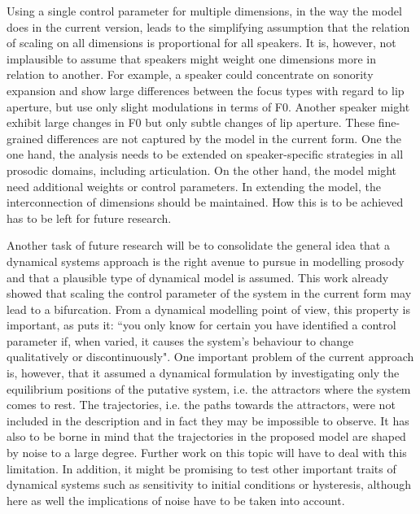 Using a single control parameter for multiple dimensions, in the way the model does in the current version, leads to the simplifying assumption that the relation of scaling on all dimensions is proportional for all speakers. It is, however, not implausible to assume that speakers might weight one dimensions more in relation to another. For example, a speaker could concentrate on sonority expansion and show large differences between the focus types with regard to lip aperture, but use only slight modulations in terms of F0. Another speaker might exhibit large changes in F0 but only subtle changes of lip aperture. These fine-grained differences are not captured by the model in the current form. One the one hand, the analysis needs to be extended on speaker-specific strategies in all prosodic domains, including articulation. On the other hand, the model might need additional weights or control parameters. In extending the model, the interconnection of dimensions should be maintained. How this is to be achieved has to be left for future research.

Another task of future research will be to consolidate the general idea that a dynamical systems approach is the right avenue to pursue in modelling prosody and that a plausible type of dynamical model is assumed. This work already showed that scaling the control parameter of the system in the current form may lead to a bifurcation. From a dynamical modelling point of view, this property is important, as \citet[1538]{Kelso2013} puts it: ``you only know for certain you have identified a control parameter if, when varied, it causes the system’s behaviour to change qualitatively or discontinuously". One important problem of the current approach is, however, that it assumed a dynamical formulation by investigating only the equilibrium positions of the putative system, i.e. the attractors where the system comes to rest. The trajectories, i.e. the paths towards the attractors, were not included in the description and in fact they may be impossible to observe. It has also to be borne in mind that the trajectories in the proposed model are shaped by noise to a large degree. Further work on this topic will have to deal with this limitation. In addition, it might be promising to test other important traits of dynamical systems such as sensitivity to initial conditions or hysteresis, although here as well the implications of noise have to be taken into account. 

